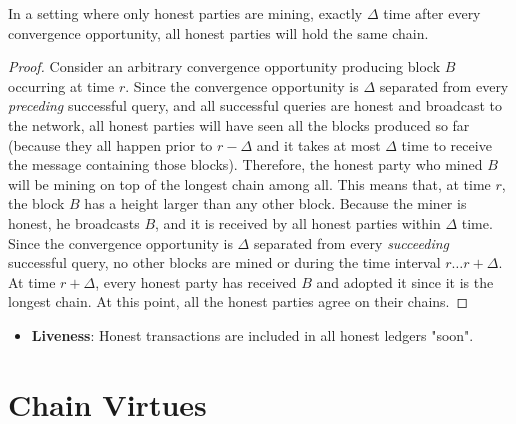 \begin{lemma}\label{lem:honest-convergence}
    In a setting where only honest parties are mining, exactly $\Delta$ time after every convergence
    opportunity, all honest parties will hold the same chain.
\end{lemma}
\begin{proof}
    Consider an arbitrary convergence opportunity producing block $B$ occurring at time $r$.
    Since the convergence opportunity is $\Delta$ separated from every \emph{preceding} successful query,
    and all successful queries are honest and broadcast to the network, all honest parties will
    have seen all the blocks produced so far (because they all happen prior to $r - \Delta$ and it
    takes at most $\Delta$ time to receive the message containing those blocks).
    Therefore, the honest party who mined $B$
    will be mining on top of the longest chain among all. This means
    that, at time $r$, the block $B$ has a height larger than any other
    block. Because the miner is honest, he broadcasts $B$, and it is received by all honest parties within $\Delta$
    time. Since the convergence opportunity is $\Delta$ separated from every \emph{succeeding} successful
    query, no other blocks are mined or during the time interval $r \ldots r + \Delta$.
    At time $r + \Delta$, every honest party has received $B$ and adopted it since it is
    the longest chain. At this point, all the honest parties agree on their chains.
\end{proof}

\begin{itemize}
    \label{sec:liveness}
    \item \textbf{Liveness}: Honest transactions are included in all honest ledgers "soon".
\end{itemize}

\section{Chain Virtues}
